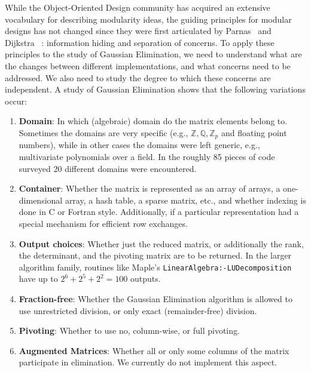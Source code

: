 \documentclass{llncs}
\begin{document}
While the Object-Oriented Design community has acquired an extensive
vocabulary for describing modularity ideas, the guiding principles for
modular designs has not changed since they were first articulated by
Parnas~\cite{journals/cacm/parnas72a} and Dijkstra~
\cite{EWD:EWD447}: information hiding and separation of concerns.  To
apply these principles to the study of Gaussian Elimination, we need
to understand what are the changes between different implementations, and 
what concerns need to be addressed.  We also need to study the degree
to which these concerns are independent.
A study of Gaussian Elimination \cite{carette04} shows that
the following variations occur:
\begin{enumerate}
\vspace*{-6pt}
    \item \textbf{Domain}: In which (algebraic) domain do the
      matrix elements belong to.  Sometimes the domains are very
      specific (e.g., $\mathbb{Z}, \mathbb{Q}, \mathbb{Z}_p$ and
      floating point numbers), while in other cases the domains
      were left generic, e.g., multivariate polynomials over a
      field.  In the roughly 85 pieces of code surveyed
      \cite{carette04} 20 different domains were encountered.
    \item \textbf{Container}: Whether the matrix is represented as
      an array of arrays, a one-dimensional array, a hash table, a
      sparse matrix, etc., and whether indexing is done in C or
      Fortran style.  Additionally, if a particular representation
      had a special mechanism for efficient row exchanges.
    \item \textbf{Output choices}: Whether just the reduced
      matrix, or additionally the rank, the determinant, and the
      pivoting matrix are to be returned. In the larger algorithm
      family, routines like Maple's
      \texttt{LinearAlgebra:-LUDecomposition} have up to $2^6 +
      2^5 + 2^2 = 100$ outputs.
    \item \textbf{Fraction-free}: Whether the Gaussian Elimination
        algorithm is allowed to use unrestricted division, or only
        exact (remainder-free) division.
    \item \textbf{Pivoting}: Whether to use no, 
        column-wise, or full pivoting.
    \item \textbf{Augmented Matrices}: Whether all or only some
      columns of the matrix participate in elimination. We currently
        do not implement this aspect.
\end{enumerate}
\end{document}
